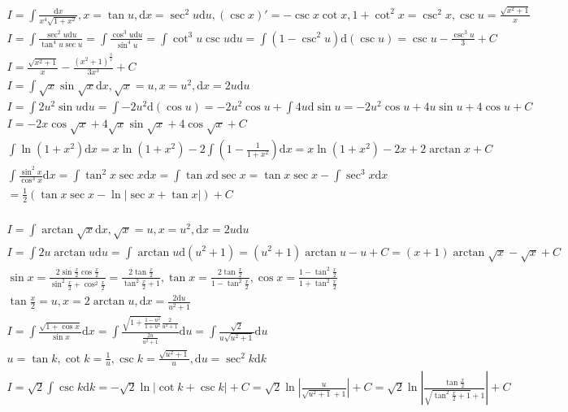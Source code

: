 \documentclass{article}
\begin{document}
\begin{align*}
    I = \int \frac{\mathrm{d}x}{x^4\sqrt{1+x^2}} , x = \tan u , \mathrm{d} x = \sec^2 u \mathrm{d} u ,(\csc x)' = -\csc x \cot x , 1 + \cot^2 x = \csc^2 x , \csc u = \frac{\sqrt{x^2+1}}{x}\\
    I = \int \frac{\sec^2 u \mathrm{d}u}{\tan^4 u \sec u} = \int \frac{\cos^3 u\mathrm{d}u}{\sin^4 u} = \int \cot^3 u \csc u\mathrm{d}u = \int (1-\csc^2 u) \mathrm{d}(\csc u) = \csc u - \frac{\csc^3 u}{3} + C \\ 
    I = \frac{\sqrt{x^2+1}}{x} - \frac{(x^2+1)^{\frac{3}{2}}}{3x^3} + C \\
    I = \int \sqrt{x}\sin \sqrt{x} \mathrm{d}x , \sqrt{x} = u, x = u^2 , \mathrm{d}x = 2u\mathrm{d}u \\
    I = \int 2u^2\sin u \mathrm{d}u = \int -2u^2\mathrm{d}(\cos u) = -2u^2\cos u + \int 4u \mathrm{d}\sin u = -2u^2\cos u+ 4u\sin u + 4 \cos u + C \\ 
    I = -2x\cos \sqrt{x}+4\sqrt{x}\sin \sqrt{x} + 4\cos \sqrt{x} + C \\
    \int \ln(1+x^2)\mathrm{d}x = x\ln(1+x^2) - 2\int \left( 1 - \frac{1}{1+x^2}\right) \mathrm{d}x = x\ln(1+x^2)-2x+ 2\arctan x + C \\
    \int \frac{\sin^2 x}{\cos^3 x}\mathrm{d}x = \int \tan^2 x \sec x \mathrm{d}x = \int \tan x \mathrm{d} \sec x = \tan x \sec x - \int \sec^3 x \mathrm{d}x \\ 
    = \frac{1}{2}(\tan x\sec x  - \ln|\sec x + \tan x|) + C\\
\end{align*}

\clearpage
\begin{align*} 
    I = \int \arctan \sqrt{x} \mathrm{d}x , \sqrt{x} = u ,x = u^2 , \mathrm{d}x = 2u\mathrm{d}u \\
    I = \int 2u\arctan u \mathrm{d}u = \int \arctan u \mathrm{d}(u^2+1) = (u^2+1)\arctan u - u + C = (x+1)\arctan\sqrt{x} - \sqrt{x} + C\\
    \sin x = \frac{2\sin \frac{x}{2}\cos \frac{x}{2}}{\sin^2 \frac{x}{2} + \cos^2 \frac{x}{2}} = \frac{2\tan \frac{x}{2}}{\tan^2 \frac{x}{2} + 1} ,\tan x = \frac{2\tan \frac{x}{2}}{1 - \tan^2 \frac{x}{2}} , \cos x = \frac{1-\tan^2 \frac{x}{2}}{1+ \tan^2 \frac{x}{2}} \\
    \tan \frac{x}{2} = u , x = 2\arctan u ,\mathrm{d}x = \frac{2\mathrm{d}u}{u^2+1}\\
    I = \int \frac{\sqrt{1+\cos x}}{\sin x}\mathrm{d}x = \int \frac{\sqrt{1+\frac{1-u^2}{1+u^2}}\frac{2}{u^2+1}}{\frac{2u}{u^2+1}}\mathrm{d}u = \int \frac{\sqrt{2}}{u\sqrt{u^2+1}}\mathrm{d}u \\
    u = \tan k ,\cot k = \frac{1}{u} , \csc k = \frac{\sqrt{u^2+1}}{u} , \mathrm{d} u = \sec^2 k \mathrm{d} k \\
    I = \sqrt{2} \int \csc k \mathrm{d} k = -\sqrt{2}\ln|\cot k + \csc k| + C = \sqrt{2}\ln\left|\frac{u}{\sqrt{u^2+1}+1}\right| + C = \sqrt{2} \ln \left| \frac{\tan \frac{x}{2}}{\sqrt{\tan^2 \frac{x}{2}+1} + 1}\right| + C \\
\end{align*}
\end{document}
